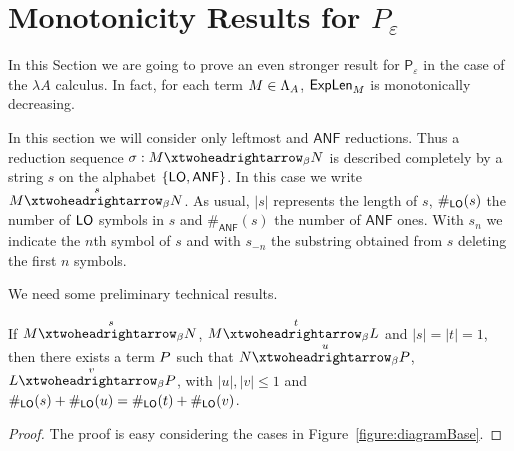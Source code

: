 \section{Monotonicity Results for $P_\varepsilon$}
In this Section we are going to prove an even stronger result for $\mathsf{P}_\varepsilon$ in the case of the $\lambda A$ calculus. In fact, for each term $M\in\Lambda_A$, $\textsf{ExpLen}_{M}$ is monotonically decreasing.
\begin{notation}
	In this section we will consider only leftmost and $\textsf{ANF}$ reductions. Thus a reduction sequence $\sigma:\termone\redbetared{}\termtwo$ is described completely by a string $s$ on the alphabet $\{\textsf{LO},\textsf{ANF}\}$. In this case we write $\termone\redbetared{s}\termtwo$. As usual, $|s|$ represents the length of $s$, $\#_{\textsf{LO}}(s)$ the number of $\textsf{LO}$ symbols in $s$ and $\#_\textsf{ANF}(s)$ the number of $\textsf{ANF}$ ones. With $s_n$ we indicate the $n$th symbol of $s$ and with $s_{-n}$ the substring obtained from $s$ deleting the first $n$ symbols.
\end{notation}
We need some preliminary technical results.
\begin{lemma}\label{lemma:LObase}
	If $\termone\redbetared{s}\termtwo$, $\termone\redbetared{t}\termthree$ and $|s|=|t|=1$, then there exists a term $P$ such that $\termtwo\redbetared{u}\termfour$, $\termthree\redbetared{v}\termfour$, with $|u|,|v|\leq 1$ and $\#_{\textsf{LO}}(s)+\#_{\textsf{LO}}(u)=\#_{\textsf{LO}}(t)+\#_{\textsf{LO}}(v)$.
\end{lemma}
\begin{proof}
	The proof is easy considering the cases in Figure~\ref{figure:diagramBase}.
\end{proof}
